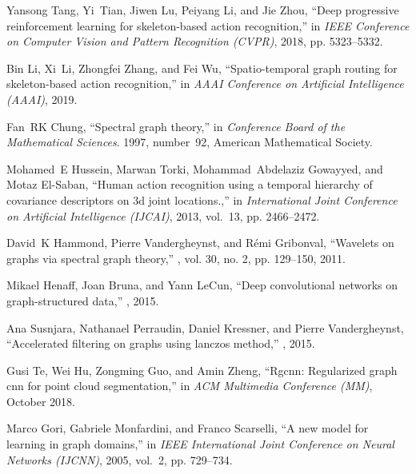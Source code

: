 \documentclass[conference]{IEEEtran}
\begin{document}
\begin{thebibliography}{10}
  Yansong Tang, Yi~Tian, Jiwen Lu, Peiyang Li, and Jie Zhou,
  \newblock ``Deep progressive reinforcement learning for skeleton-based action
    recognition,''
  \newblock in {\em IEEE Conference on Computer Vision and Pattern Recognition
    (CVPR)}, 2018, pp. 5323--5332.
  
  Bin Li, Xi~Li, Zhongfei Zhang, and Fei Wu,
  \newblock ``Spatio-temporal graph routing for skeleton-based action
    recognition,''
  \newblock in {\em AAAI Conference on Artificial Intelligence (AAAI)}, 2019.
  
  Fan~RK Chung,
  \newblock ``Spectral graph theory,''
  \newblock in {\em Conference Board of the Mathematical Sciences}. 1997,
    number~92, American Mathematical Society.
  
  Mohamed~E Hussein, Marwan Torki, Mohammad~Abdelaziz Gowayyed, and Motaz
    El-Saban,
  \newblock ``Human action recognition using a temporal hierarchy of covariance
    descriptors on 3d joint locations.,''
  \newblock in {\em International Joint Conference on Artificial Intelligence
    (IJCAI)}, 2013, vol.~13, pp. 2466--2472.
  
  David~K Hammond, Pierre Vandergheynst, and R{\'e}mi Gribonval,
  \newblock ``Wavelets on graphs via spectral graph theory,''
  , vol. 30,
    no. 2, pp. 129--150, 2011.
  
  Mikael Henaff, Joan Bruna, and Yann LeCun,
  \newblock ``Deep convolutional networks on graph-structured data,''
  , 2015.
  
  Ana Susnjara, Nathanael Perraudin, Daniel Kressner, and Pierre Vandergheynst,
  \newblock ``Accelerated filtering on graphs using lanczos method,''
  , 2015.
  
  Gusi Te, Wei Hu, Zongming Guo, and Amin Zheng,
  \newblock ``Rgcnn: Regularized graph cnn for point cloud segmentation,''
  \newblock in {\em ACM Multimedia Conference (MM)}, October 2018.
  
  Marco Gori, Gabriele Monfardini, and Franco Scarselli,
  \newblock ``A new model for learning in graph domains,''
  \newblock in {\em IEEE International Joint Conference on Neural Networks
    (IJCNN)}, 2005, vol.~2, pp. 729--734.
  

\end{thebibliography}
\end{document}

